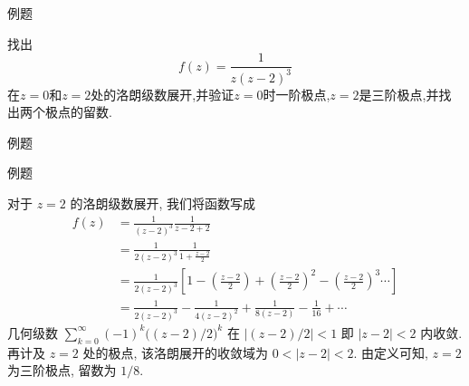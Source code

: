 \documentclass[fontset=windows, chinese, 10pt]{beamer}
\begin{document}
\begin{frame}{例题}
  \small

\begin{example}
找出\[
    f(z) = \frac{1}{z( z- 2)^3} 
    \]
    在$z=0$和$z=2$处的洛朗级数展开,并验证$z=0$时一阶极点,$z=2$是三阶极点,并找出两个极点的留数.
\end{example}

\end{frame}


\begin{frame}{例题}
  \small
\begin{solution}
\end{solution}
\end{frame}

\begin{frame}{例题}
  \small
\begin{solution}
对于 $z=2$ 的洛朗级数展开, 我们将函数写成
\[
    \begin{aligned}
        f(z) &= \frac{1}{(z-2)^3} \frac{1}{z-2 + 2}
        \\
        &= \frac{1}{2(z-2)^3} \frac{1}{1+\frac{z-2}{2}}
        \\
        &= \frac{1}{2(z-2)^3} \left[ 1 - \left(\frac{z-2}{2} \right) + \left(\frac{z-2}{2}\right)^2 - \left(\frac{z-2}{2}\right)^3 \cdots \right] 
        \\
        &= \frac{1}{2(z-2)^3} - \frac{1}{4(z-2)^2} + \frac{1}{8(z-2)} - \frac{1}{16} + \cdots
    \end{aligned}
\]
几何级数 $\sum_{k=0}^{\infty}(-1)^k\bigl((z-2)/2\bigr)^k$ 在 $|(z-2)/2|<1$ 即 $|z-2|<2$ 内收敛.
再计及 $z=2$ 处的极点, 该洛朗展开的收敛域为 $0<|z-2|<2$.
由定义可知, $z=2$ 为三阶极点, 留数为 $1/8$.
\end{solution}
\end{frame}
\end{document}
